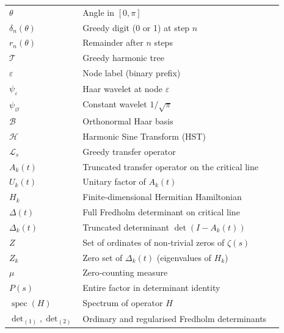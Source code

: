 \documentclass[11pt,a4paper]{article}
\begin{document}
\begin{center}
\begin{tabular}{llp{8cm}}
\(\theta\) & Angle in \([0,\pi]\) & \\
\(\delta_n(\theta)\) & Greedy digit (0 or 1) at step \(n\) & \cite{HSTpaper} \\
\(r_n(\theta)\) & Remainder after \(n\) steps & \cite{HSTpaper} \\
\(\mathcal{T}\) & Greedy harmonic tree & \cite{HSTpaper} \\
\(\varepsilon\) & Node label (binary prefix) & \cite{HSTpaper} \\
\(\psi_\varepsilon\) & Haar wavelet at node \(\varepsilon\) & \cite{HSTpaper} \\
\(\psi_\varnothing\) & Constant wavelet \(1/\sqrt{\pi}\) & \cite{HSTpaper} \\
\(\mathcal{B}\) & Orthonormal Haar basis & \cite{HSTpaper} \\
\(\mathcal{H}\) & Harmonic Sine Transform (HST) & \cite{HSTpaper} \\
\(\mathcal{L}_s\) & Greedy transfer operator & \cite{HSTpaper} \\
\(A_k(t)\) & Truncated transfer operator on the critical line & \cite{RHproof} \\
\(U_k(t)\) & Unitary factor of \(A_k(t)\) & \cite{RHproof} \\
\(H_k\) & Finite‑dimensional Hermitian Hamiltonian & \cite{RHproof} \\
\(\Delta(t)\) & Full Fredholm determinant on critical line & \cite{RHproof} \\
\(\Delta_k(t)\) & Truncated determinant \(\det(I-A_k(t))\) & \cite{RHproof} \\
\(Z\) & Set of ordinates of non‑trivial zeros of \(\zeta(s)\) & \\
\(Z_k\) & Zero set of \(\Delta_k(t)\) (eigenvalues of \(H_k\)) & \cite{RHproof} \\
\(\mu\) & Zero‑counting measure & \cite{RHproof} \\
\(P(s)\) & Entire factor in determinant identity & \cite{DeterminantProof} \\
\(\operatorname{spec}(H)\) & Spectrum of operator \(H\) & \\
\(\det\nolimits_{(1)},\det\nolimits_{(2)}\) & Ordinary and regularised Fredholm determinants & \cite{TraceClass} \\
\end{tabular}
\end{center}
\end{document}
